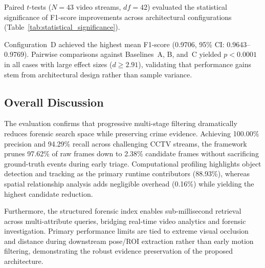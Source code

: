 Paired $t$-tests ($N=43$ video streams, $df=42$) evaluated the statistical significance of F1-score improvements across architectural configurations (Table~\ref{tab:statistical_significance}).

\begin{table}[htbp]
\centering
\caption{Statistical significance of progressive architectural improvements in F1-score.}
\label{tab:statistical_significance}
\end{table}

Configuration~D achieved the highest mean F1-score (0.9706, 95\% CI: 0.9643--0.9769). Pairwise comparisons against Baselines~A, B, and~C yielded $p < 0.0001$ in all cases with large effect sizes ($d \geq 2.91$), validating that performance gains stem from architectural design rather than sample variance.

\subsection{Overall Discussion}

The evaluation confirms that progressive multi-stage filtering dramatically reduces forensic search space while preserving crime evidence. Achieving 100.00\% precision and 94.29\% recall across challenging CCTV streams, the framework prunes 97.62\% of raw frames down to 2.38\% candidate frames without sacrificing ground-truth events during early triage. Computational profiling highlights object detection and tracking as the primary runtime contributors (88.93\%), whereas spatial relationship analysis adds negligible overhead (0.16\%) while yielding the highest candidate reduction.

Furthermore, the structured forensic index enables sub-millisecond retrieval across multi-attribute queries, bridging real-time video analytics and forensic investigation. Primary performance limits are tied to extreme visual occlusion and distance during downstream pose/ROI extraction rather than early motion filtering, demonstrating the robust evidence preservation of the proposed architecture.
